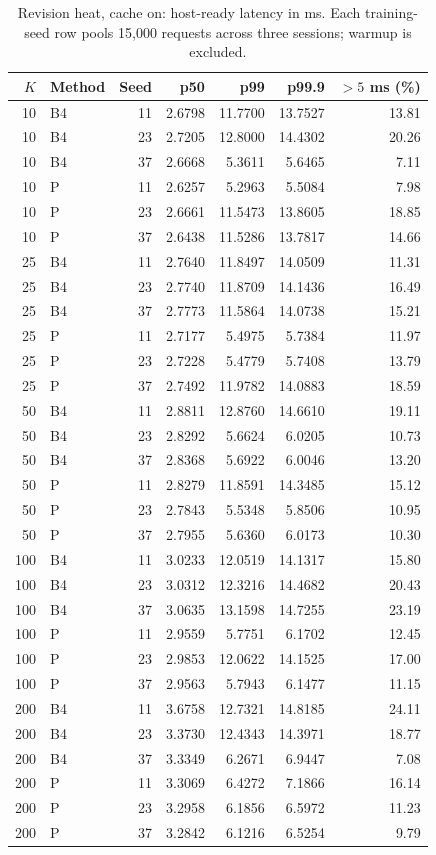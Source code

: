 \begin{table}[ht]
\centering\small
\caption{Revision heat, cache on: host-ready latency in ms. Each training-seed row pools 15,000 requests across three sessions; warmup is excluded.}\label{tab:e2_seed_heat_on}
\begin{tabular}{@{}rlrrrrr@{}}\toprule
$K$ & Method & Seed & p50 & p99 & p99.9 & $>5$ ms (\%)\\\midrule
10 & B4 & 11 & 2.6798 & 11.7700 & 13.7527 & 13.81\\
10 & B4 & 23 & 2.7205 & 12.8000 & 14.4302 & 20.26\\
10 & B4 & 37 & 2.6668 & 5.3611 & 5.6465 & 7.11\\
10 & P & 11 & 2.6257 & 5.2963 & 5.5084 & 7.98\\
10 & P & 23 & 2.6661 & 11.5473 & 13.8605 & 18.85\\
10 & P & 37 & 2.6438 & 11.5286 & 13.7817 & 14.66\\
25 & B4 & 11 & 2.7640 & 11.8497 & 14.0509 & 11.31\\
25 & B4 & 23 & 2.7740 & 11.8709 & 14.1436 & 16.49\\
25 & B4 & 37 & 2.7773 & 11.5864 & 14.0738 & 15.21\\
25 & P & 11 & 2.7177 & 5.4975 & 5.7384 & 11.97\\
25 & P & 23 & 2.7228 & 5.4779 & 5.7408 & 13.79\\
25 & P & 37 & 2.7492 & 11.9782 & 14.0883 & 18.59\\
50 & B4 & 11 & 2.8811 & 12.8760 & 14.6610 & 19.11\\
50 & B4 & 23 & 2.8292 & 5.6624 & 6.0205 & 10.73\\
50 & B4 & 37 & 2.8368 & 5.6922 & 6.0046 & 13.20\\
50 & P & 11 & 2.8279 & 11.8591 & 14.3485 & 15.12\\
50 & P & 23 & 2.7843 & 5.5348 & 5.8506 & 10.95\\
50 & P & 37 & 2.7955 & 5.6360 & 6.0173 & 10.30\\
100 & B4 & 11 & 3.0233 & 12.0519 & 14.1317 & 15.80\\
100 & B4 & 23 & 3.0312 & 12.3216 & 14.4682 & 20.43\\
100 & B4 & 37 & 3.0635 & 13.1598 & 14.7255 & 23.19\\
100 & P & 11 & 2.9559 & 5.7751 & 6.1702 & 12.45\\
100 & P & 23 & 2.9853 & 12.0622 & 14.1525 & 17.00\\
100 & P & 37 & 2.9563 & 5.7943 & 6.1477 & 11.15\\
200 & B4 & 11 & 3.6758 & 12.7321 & 14.8185 & 24.11\\
200 & B4 & 23 & 3.3730 & 12.4343 & 14.3971 & 18.77\\
200 & B4 & 37 & 3.3349 & 6.2671 & 6.9447 & 7.08\\
200 & P & 11 & 3.3069 & 6.4272 & 7.1866 & 16.14\\
200 & P & 23 & 3.2958 & 6.1856 & 6.5972 & 11.23\\
200 & P & 37 & 3.2842 & 6.1216 & 6.5254 & 9.79\\
\bottomrule\end{tabular}
\end{table}
